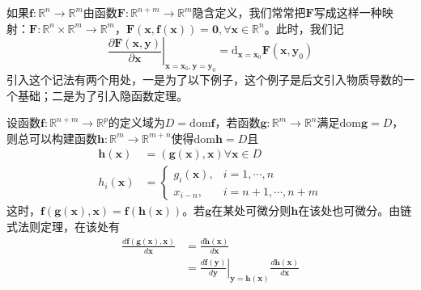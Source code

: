 \documentclass[main.tex]{subfiles}
\begin{document}
如果$\mathbf{f}:\mathbb{R}^n\rightarrow\mathbb{R}^m$由函数$\mathbf{F}:\mathbb{R}^{n+m}\rightarrow\mathbb{R}^m$隐含定义，我们常常把$\mathbf{F}$写成这样一种映射：$\mathbf{F}:\mathbb{R}^n\times\mathbb{R}^m\rightarrow\mathbb{R}^m$，$\mathbf{F}\left(\mathbf{x},\mathbf{f}\left(\mathbf{x}\right)\right)=\mathbf{0},\forall\mathbf{x}\in\mathbb{R}^n$。此时，我们记
\[\left.\frac{\partial \mathbf{F}\left(\mathbf{x},\mathbf{y}\right)}{\partial \mathbf{x}}\right|_{\mathbf{x}=\mathbf{x}_0,\mathbf{y}=\mathbf{y}_0}=
    \mathrm{d}_{\mathbf{x}=\mathbf{x}_0}\mathbf{F}\left(\mathbf{x},\mathbf{y}_0\right)\]
引入这个记法有两个用处，一是为了以下例子，这个例子是后文引入物质导数的一个基础；二是为了引入隐函数定理。

\begin{example}\label{exp:II.4.9}
    设函数$\mathbf{f}:\mathbb{R}^{n+m}\rightarrow\mathbb{R}^p$的定义域为$D=\mathrm{dom}\mathbf{f}$，若函数$\mathbf{g}:\mathbb{R}^m\rightarrow\mathbb{R}^n$满足$\mathrm{dom}\mathbf{g}=D$，则总可以构建函数$\mathbf{h}:\mathbb{R}^m\rightarrow\mathbb{R}^{m+n}$使得$\mathrm{dom}\mathbf{h}=D$且
    \begin{align*}
        \mathbf{h}\left(\mathbf{x}\right) & =\left(\mathbf{g}\left(\mathbf{x}\right),\mathbf{x}\right)\forall\mathbf{x}\in D \\
        h_i\left(\mathbf{x}\right)        & =\left\{\begin{array}{ll}
                                                        g_i\left(\mathbf{x}\right), & i=1,\cdots,n     \\
                                                        x_{i-n},                    & i=n+1,\cdots,n+m
                                                    \end{array}\right.
    \end{align*}
    这时，$\mathbf{f}\left(\mathbf{g}\left(\mathbf{x}\right),\mathbf{x}\right)=\mathbf{f}\left(\mathbf{h}\left(\mathbf{x}\right)\right)$。若$\mathbf{g}$在某处可微分则$\mathbf{h}$在该处也可微分。由链式法则定理，在该处有
    \begin{align*}
        \frac{d\mathbf{f}\left(\mathbf{g}\left(\mathbf{x}\right),\mathbf{x}\right)}{d\mathbf{x}} & =\frac{d\mathbf{h}\left(\mathbf{x}\right)}{d\mathbf{x}}                                                                                                                                                                    \\
                                                                                                 & =\left.\frac{d\mathbf{f}\left(\mathbf{y}\right)}{d\mathbf{y}}\right|_{\mathbf{y}=\mathbf{h}\left(\mathbf{x}\right)}\frac{d\mathbf{h}\left(\mathbf{x}\right)}{d\mathbf{x}}                                                  \\

\end{align*}
\end{example}
\end{document}
